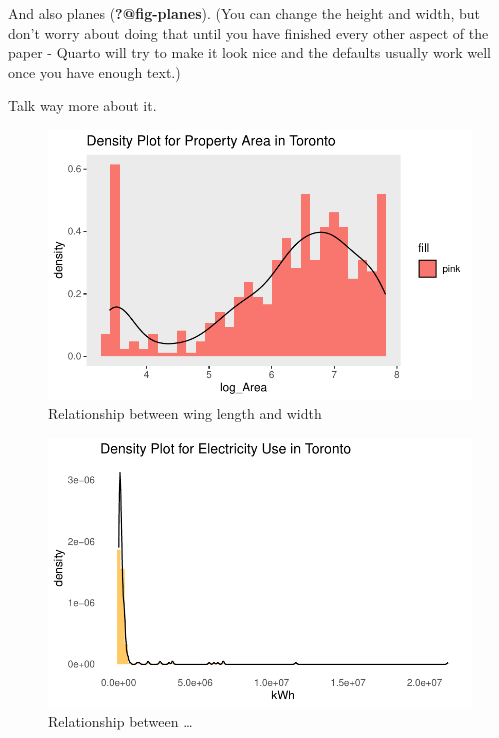 \documentclass[
  letterpaper,
  DIV=11,
  numbers=noendperiod]{scrartcl}
\begin{document}
And also planes (\textbf{?@fig-planes}). (You can change the height and
width, but don't worry about doing that until you have finished every
other aspect of the paper - Quarto will try to make it look nice and the
defaults usually work well once you have enough text.)

Talk way more about it.

\begin{figure}[H]

{\centering \includegraphics{paper_files/figure-pdf/none-1.pdf}

}

\caption{Relationship between wing length and width}

\end{figure}%

\begin{figure}[H]

{\centering \includegraphics{paper_files/figure-pdf/second-1.pdf}

}

\caption{Relationship between \ldots{}}

\end{figure}%
\end{document}
